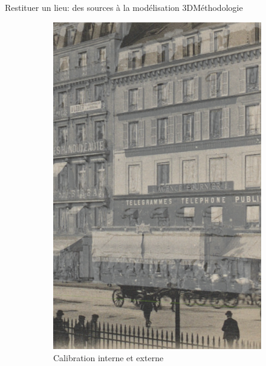 \documentclass[8pt]{beamer}
\begin{document}
\begin{frame}{Restituer un lieu: des sources à la modélisation 3D}{Méthodologie}
\begin{figure}
\begin{subfigure}{0.25\textwidth}
			\includegraphics[width=\textwidth]{includes/c_slide9_2.png}
			\caption{Calibration interne et externe}
		\end{subfigure}
		\begin{subfigure}{0.23\textwidth}

\end{subfigure}
\end{figure}
\end{frame}
\end{document}
